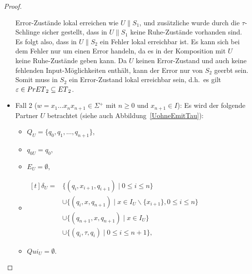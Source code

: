 \begin{proof}
\begin{itemize}
      Error-Zustände lokal erreichen wie $U\|S_1$, und zusätzliche wurde durch die
      $\tau$-Schlinge sicher gestellt, dass in $U\|S_1$ keine Ruhe-Zustände
      vorhanden sind. Es folgt also, dass in $U\|S_2$ ein Fehler lokal
      erreichbar ist. Es kann sich bei dem Fehler nur um einen Error handeln,
      da es in der Komposition mit $U$ keine Ruhe-Zustände geben kann. Da $U$
      keinen Error-Zustand und auch keine fehlenden Input-Möglichkeiten
      enthält, kann der Error nur von $S_2$ geerbt sein. Somit muss in $S_2$
      ein Error-Zustand lokal erreichbar sein, d.h.\ es gilt $\varepsilon\in
      PrET{}_2\subseteq ET{}_2$.
    \item Fall 2 ($w=x_1\dots x_nx_{n+1}\in\Sigma{} ^+$ mit $n\geq 0$ und
      $x_{n+1}\in I$): Es wird der folgende Partner $U$ betrachtet (siehe auch
      Abbildung~\ref{UohneEmitTau}):
      \begin{itemize}
        \item $Q_U=\{q_0,q_1,\dots ,q_{n+1}\}$,
        \item $q_{0U}=q_0$,
        \item $E_U=\emptyset$,
        \item $\begin{aligned}[t]
            \delta _U=&\{(q_i,x_{i+1},q_{i+1})\mid  0\leq i\leq n\}\\
                      &\cup\{(q_i,x,q_{n+1})\mid  x\in I_U\backslash\{x_{i+1}\},
          0\leq i\leq n\}\\
          &\cup\{(q_{n+1},x,q_{n+1})\mid  x\in I_U\}\\
          &\cup\{(q_i,\tau,q_i)\mid 0\leq i\leq n+1\},
        \end{aligned}$
        \item $Qui_U = \emptyset$.
      \end{itemize}
      \begin{figure} [h!tbp]
      \begin{center}
\end{center}
\end{figure}
\end{itemize}
\end{proof}
